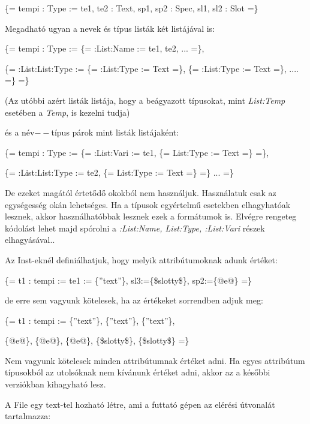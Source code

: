 \{= tempi : Type := te1, te2 : Text, sp1, sp2 : Spec, sl1, sl2 : Slot =\}

Megadható ugyan a nevek és típus listák két listájával is:

\{= tempi : Type := \{= :List:Name := te1, te2, ... =\}, 

\{= :List:List:Type := \{= :List:Type := Text =\}, \{= :List:Type := Text =\}, .... =\} =\}

(Az utóbbi azért listák listája, hogy a beágyazott típusokat, mint \textit{List:Temp} esetében a \textit{Temp}, is kezelni tudja)  

és a név$--$típus párok mint listák listájaként:

\{= tempi : Type := \{= :List:Vari := te1, \{= List:Type := Text =\} =\}, 

\{= :List:List:Type := te2, \{= List:Type := Text =\} =\} ... =\}

De ezeket magától értetődő okokból nem használjuk.
Használatuk csak az egységesség okán lehetséges.
Ha a típusok egyértelmű esetekben elhagyhatóak lesznek, akkor használhatóbbak lesznek ezek a formátumok is.
Elvégre rengeteg kódolást lehet majd spórolni a \textit{:List:Name, List:Type, :List:Vari} részek elhagyásával..

Az Inst-eknél definiálhatjuk, hogy melyik attribútumoknak adunk értéket:

\{= t1 : tempi := te1 := \{”text”\}, sl3:=\{\$slotty\$\}, sp2:=\{@e@\} =\}

de erre sem vagyunk kötelesek, ha az értékeket sorrendben adjuk meg:

\{= t1 : tempi := \{”text”\}, \{”text”\}, \{”text”\}, 

\{@e@\}, \{@e@\}, \{@e@\}, \{\$slotty\$\}, \{\$slotty\$\} =\}

Nem vagyunk kötelesek minden attribútumnak értéket adni.
Ha egyes attribútum típusokból az utolsóknak nem kívánunk értéket adni, akkor az a későbbi verziókban kihagyható lesz.

A File egy text-tel hozható létre, ami a futtató gépen az elérési útvonalát tartalmazza:

